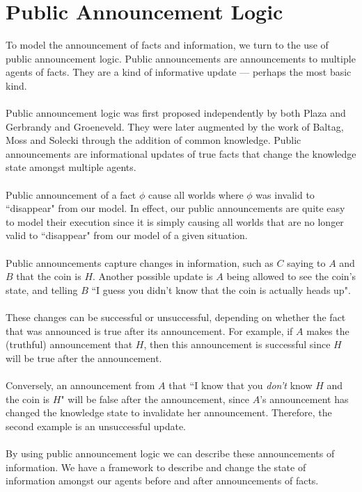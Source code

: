 \documentclass[12pt, a4paper, twoside]{article}
\begin{document}
\section{Public Announcement Logic}\label{pal}
To model the announcement of facts and information, we turn to the use of public
announcement logic.
Public announcements are announcements to multiple agents of facts.
They are a kind of informative update --- perhaps the most basic kind.\\
\\
Public announcement logic was first proposed independently by both Plaza and
Gerbrandy and Groeneveld.
They were later augmented by the work of Baltag, Moss and Solecki through the
addition of common knowledge.
Public announcements are informational updates of true facts that change the
knowledge state amongst multiple agents.\\
\\
Public announcement of a fact $\phi$ cause all worlds where $\phi$ was
invalid to ``disappear" from our model.
In effect, our public announcements are quite easy to model their execution
since it is simply causing all worlds that are no longer valid to ``disappear"
from our model of a given situation.\\
\\
Public announcements capture changes in information, such as $C$ saying to
$A$ and $B$ that the coin is $H$.
Another possible update is $A$ being allowed to see the coin's state, and
telling $B$ ``I guess you didn't know that the coin is actually heads up".\\
\\
These changes can be successful or unsuccessful, depending on whether the fact
that was announced is true after its announcement.
For example, if $A$ makes the (truthful) announcement that $H$, then this
announcement is successful since $H$ will be true after the announcement.\\
\\
Conversely, an announcement from $A$ that ``I know that you {\em don't} know $H$
and the coin is $H$" will be false after the announcement, since $A$'s
announcement has changed the knowledge state to invalidate her
announcement.
Therefore, the second example is an unsuccessful update.\\
\\
By using public announcement logic we can describe these announcements of
information.
We have a framework to describe and change the state of information amongst our
agents before and after announcements of facts.
\end{document}
